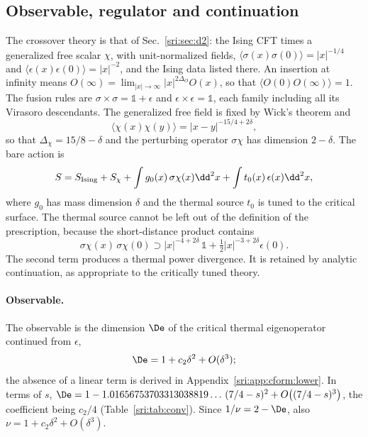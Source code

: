 \subsection{Observable, regulator and continuation}\label{sri:app:cform:conv}
The crossover theory is that of Sec.~\ref{sri:sec:d2}: the Ising CFT times a generalized free scalar $\chi$, with
unit-normalized fields, $\langle\sigma(x)\sigma(0)\rangle=|x|^{-1/4}$ and $\langle\epsilon(x)\epsilon(0)\rangle=|x|^{-2}$,
and the Ising data listed there. An insertion at infinity means
$O(\infty)=\lim_{|x|\to\infty}|x|^{2\Delta_O}O(x)$, so that $\langle O(0)O(\infty)\rangle=1$. The fusion rules are
$\sigma\times\sigma=\mathbb 1+\epsilon$ and $\epsilon\times\epsilon=\mathbb 1$, each family including all its Virasoro
descendants. The generalized free field is fixed by Wick's theorem and
\begin{equation}
 \langle\chi(x)\chi(y)\rangle=|x-y|^{-15/4+2\delta},
 \label{sri:eq:cform:gff}
\end{equation}
so that $\Delta_\chi=15/8-\delta$ and the perturbing operator $\sigma\chi$ has dimension $2-\delta$. The bare action is
\begin{equation}
 S=S_{\rm Ising}+S_\chi+\int g_0(x)\,\sigma\chi(x)\dd^2x+\int t_0(x)\,\epsilon(x)\dd^2x,
\end{equation}
where $g_0$ has mass dimension $\delta$ and the thermal source $t_0$ is tuned to the critical surface. The thermal
source cannot be left out of the definition of the prescription, because the short-distance product contains
\begin{equation}
 \sigma\chi(x)\,\sigma\chi(0)\supset|x|^{-4+2\delta}\,\mathbb 1+\tfrac12|x|^{-3+2\delta}\epsilon(0).
\end{equation}
The second term produces a thermal power divergence. It is retained by analytic continuation, as appropriate to the
critically tuned theory.

\paragraph{Observable.} The observable is the dimension $\De$ of the critical thermal eigenoperator continued from
$\epsilon$,
\begin{equation}
 \De=1+c_2\delta^2+O(\delta^3);
\end{equation}
the absence of a linear term is derived in Appendix~\ref{sri:app:cform:lower}. In terms of $s$,
$\De=1-1.01656753703313038819\ldots\,(7/4-s)^2+O\bigl((7/4-s)^3\bigr)$, the coefficient being $c_2/4$
(Table~\ref{sri:tab:conv}). Since $1/\nu=2-\De$, also $\nu=1+c_2\delta^2+O(\delta^3)$.

